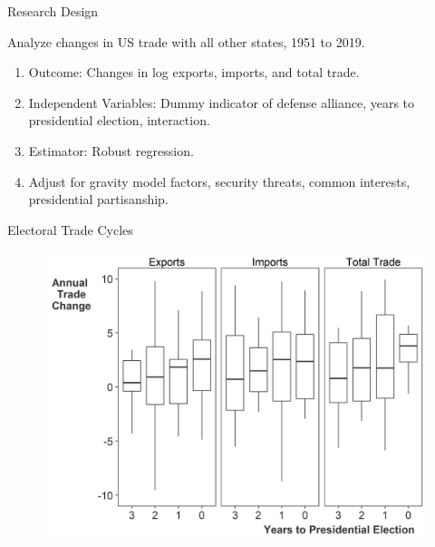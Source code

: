 \documentclass[12pt]{beamer}
\begin{document}
\begin{frame}{Research Design}

\pause
Analyze changes in US trade with all other states, 1951 to 2019. 
\pause
\begin{enumerate}
\item Outcome: Changes in log exports, imports, and total trade.
\pause
\item Independent Variables: Dummy indicator of defense alliance, years to presidential election, interaction. 
\pause 
\item Estimator: Robust regression. 
\pause 
\item Adjust for gravity model factors, security threats, common interests, presidential partisanship.
\end{enumerate} 

\end{frame} 


\begin{frame}{Electoral Trade Cycles}

\begin{figure}[htbp]
	\centering
		\includegraphics[height=.9\textheight]{us-trade-cycles.png}
\end{figure}


\end{frame} 


\end{document}
